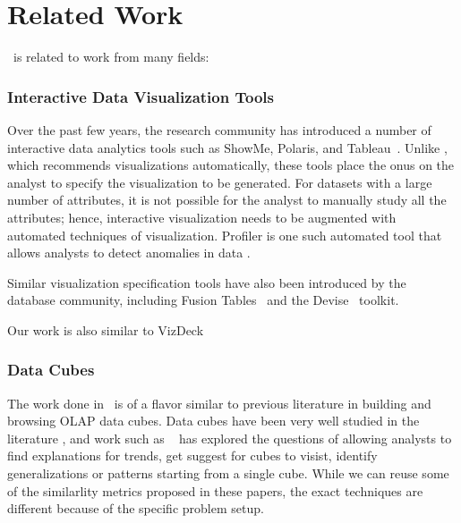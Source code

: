 

\section{Related Work}
\label{sec:related_work}


\SeeDB\ is related to work from many fields:

\subsubsection*{Interactive Data Visualization Tools}
Over the past few years, the research community has introduced a number of
interactive data analytics tools such as ShowMe, Polaris, and 
Tableau~\cite{DBLP:journals/cacm/StolteTH08, DBLP:journals/tvcg/MackinlayHS07}.
Unlike \SeeDB, which recommends visualizations automatically, these tools place
the onus on the analyst to specify the visualization to be generated.
For datasets with a large number of attributes, it is not possible
for the analyst to manually study all the attributes; hence, interactive
visualization needs to be augmented with automated techniques of visualization.
Profiler is one such automated tool that allows analysts to detect anomalies in
data \cite{DBLP:conf/AVI/KandelPPHH12}.

Similar visualization specification tools have also been introduced by the
database community, including Fusion
Tables~\cite{DBLP:conf/sigmod/GonzalezHJLMSSG10} and the
Devise~\cite{DBLP:conf/sigmod/LivnyRBCDLMW97} toolkit.

Our work is also similar to VizDeck 

\subsubsection*{Data Cubes}
The work done in \SeeDB\ is of a flavor similar to previous literature in
building and browsing OLAP data cubes. Data cubes have been very well studied in
the literature \cite{DBLP:conf/SIGMOD/HarinarayanRU96,
DBLP:jounral/DMKD/GrayCBLR97}, and work such as
~\cite{DBLP:conf/vldb/Sarawagi99, DBLP:conf/vldb/SatheS01,
DBLP:conf/vldb/Sarawagi00, DBLP:conf/SIGKDD/OrdonezC09} has explored the
questions of allowing analysts to find explanations for trends, get suggest for
cubes to visist, identify generalizations or patterns starting from a single
cube. While we can reuse some of the similarlity metrics proposed in these
papers, the exact techniques are different because of the specific problem
setup.

